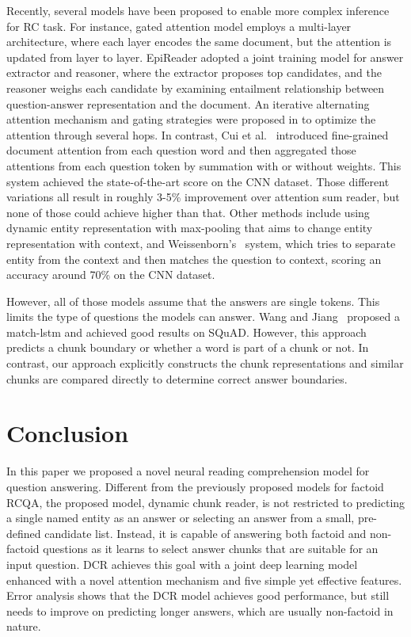\documentclass[letterpaper]{article}
\begin{document}
Recently, several models have been proposed to enable more complex inference for RC task. For instance, gated attention model \cite{dhingra2016gated} employs a multi-layer architecture, where each layer encodes the same document, but the attention is updated from layer to layer. EpiReader \cite{trischler2016natural} adopted a joint training model for answer extractor and reasoner, where the extractor proposes top candidates, and the reasoner weighs each candidate by examining entailment relationship between question-answer representation and the document. An iterative alternating attention mechanism and gating strategies were proposed in \cite{sordoni2016iterative} to optimize the attention through several hops. 
In contrast, Cui et al.~ introduced fine-grained document attention from each question word and then aggregated those attentions from each question token by summation with or without weights. This system achieved the  state-of-the-art score on the CNN dataset.
Those different variations all result in roughly 3-5\% improvement over attention sum reader, but none of those could achieve higher than that.
Other methods include using dynamic entity representation with max-pooling \cite{kobayashi2016dynamic} that aims to change entity representation with context, and Weissenborn's~ system, which tries to separate entity from the context and then matches the question to context, scoring an accuracy around 70\% on the CNN dataset. 

However, all of those models assume that the answers are single tokens. This limits the type of questions the models can answer. Wang and Jiang~ proposed a match-lstm and achieved good results on SQuAD. However, this approach predicts a chunk boundary or whether a word is part of a chunk or not. In contrast, our approach explicitly constructs the chunk representations and similar chunks are compared directly to determine correct answer boundaries.







\section{Conclusion}
In this paper we proposed a novel neural reading comprehension model for question answering. Different from the previously proposed models for factoid RCQA, the proposed model, dynamic chunk reader, is not restricted to predicting a single named entity as an answer or selecting an answer from a small, pre-defined candidate list. Instead, it is capable of answering both factoid and non-factoid questions as it learns to select answer chunks that are suitable for an input question. DCR achieves this goal with a joint deep learning model enhanced with a novel attention mechanism and five simple yet effective features. Error analysis shows that the DCR model achieves good performance, but still needs to improve on predicting longer answers, which are usually non-factoid in nature.



\begin{quote}
\begin{small}


\end{small}
\end{quote}
\end{document}

